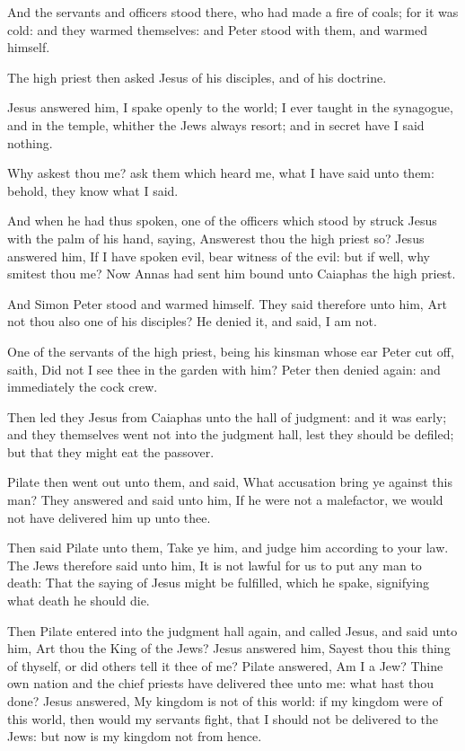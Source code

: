 \Verse And the servants and officers stood there, who had made a fire of coals; for it was cold: and they warmed themselves: and Peter stood with them, and warmed himself.

\Verse The high priest then asked Jesus of his disciples, and of his doctrine.

\Verse Jesus answered him, I spake openly to the world; I ever taught in the synagogue, and in the temple, whither the Jews always resort; and in secret have I said nothing.

\Verse Why askest thou me? ask them which heard me, what I have said unto them: behold, they know what I said.

\Verse And when he had thus spoken, one of the officers which stood by struck Jesus with the palm of his hand, saying, Answerest thou the high priest so?  \Verse Jesus answered him, If I have spoken evil, bear witness of the evil: but if well, why smitest thou me?  \Verse Now Annas had sent him bound unto Caiaphas the high priest.

\Verse And Simon Peter stood and warmed himself. They said therefore unto him, Art not thou also one of his disciples? He denied it, and said, I am not.

\Verse One of the servants of the high priest, being his kinsman whose ear Peter cut off, saith, Did not I see thee in the garden with him?  \Verse Peter then denied again: and immediately the cock crew.

\Verse Then led they Jesus from Caiaphas unto the hall of judgment: and it was early; and they themselves went not into the judgment hall, lest they should be defiled; but that they might eat the passover.

\Verse Pilate then went out unto them, and said, What accusation bring ye against this man?  \Verse They answered and said unto him, If he were not a malefactor, we would not have delivered him up unto thee.

\Verse Then said Pilate unto them, Take ye him, and judge him according to your law. The Jews therefore said unto him, It is not lawful for us to put any man to death: \Verse That the saying of Jesus might be fulfilled, which he spake, signifying what death he should die.

\Verse Then Pilate entered into the judgment hall again, and called Jesus, and said unto him, Art thou the King of the Jews?  \Verse Jesus answered him, Sayest thou this thing of thyself, or did others tell it thee of me?  \Verse Pilate answered, Am I a Jew? Thine own nation and the chief priests have delivered thee unto me: what hast thou done?  \Verse Jesus answered, My kingdom is not of this world: if my kingdom were of this world, then would my servants fight, that I should not be delivered to the Jews: but now is my kingdom not from hence.


